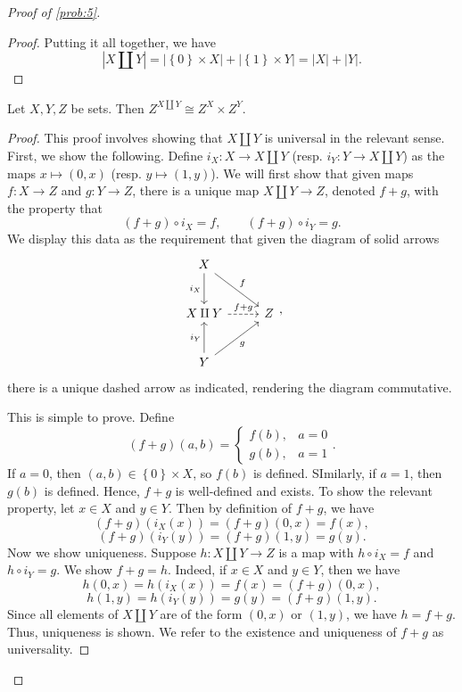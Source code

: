 \documentclass[11pt, letterpaper]{article}
\theoremstyle{definition}
\begin{document}
\begin{proof}[Proof of \cref{prob:5}]
\begin{proof}
		Putting it all together, we have
		\[
			\left| X\amalg Y \right| =\left| \left\{ 0 \right\} \times X \right| + \left| \left\{ 1 \right\} \times Y \right| =\left| X \right| +\left| Y \right| 
		.\]
	\end{proof}
	\begin{lemma}\label{lma:5-8}
		Let $X,Y,Z$ be sets. Then $Z^{X \amalg Y} \cong Z^X \times Z^Y$.
	\end{lemma}
	\begin{proof}
		This proof involves showing that $X\amalg Y$ is universal in the relevant sense. First, we show the following. Define $i_X : X \to X\amalg Y$ (resp. $i_Y : Y \to X\amalg Y$) as the maps $x\mapsto (0,x)$ (resp. $y\mapsto (1,y)$). We will first show that given maps $f : X \to Z$ and $g : Y \to Z$, there is a unique map $X\amalg Y\to Z$, denoted $f+g$, with the property that
		\[
			(f+g)\circ i_X = f,\qquad (f+g)\circ i_Y = g
		.\]
		We display this data as the requirement that given the diagram of solid arrows
		\[
			\begin{tikzcd}[row sep = 2.5em, column sep = 2.5em]
			X \ar[" i_X "', d] \ar[" f ", dr]  &  \\
			X \amalg Y \ar[" f+g ", dashed, r]  & Z \\
			Y \ar[" i_Y ", u] \ar[" g "', ur]  & 
		\end{tikzcd},
		\]
		there is a unique dashed arrow as indicated, rendering the diagram commutative.

		This is simple to prove. Define
		\[
			(f+g)(a,b) =\begin{cases}
				f(b), & a=0 \\
				g(b), & a=1
			\end{cases}
		.\]
		If $a=0$, then $(a,b)\in \left\{ 0 \right\} \times X$, so $f(b)$ is defined. SImilarly, if $a=1$, then $g(b)$ is defined. Hence, $f+g$ is well-defined and exists. To show the relevant property, let $x\in X$ and $y\in Y$. Then by definition of $f+g$, we have
		\[
			(f+g)(i_X(x)) = (f+g)(0,x) = f(x),
		\]
		\[
			(f+g)(i_Y(y)) = (f+g)(1,y) = g(y)
		.\]
		Now we show uniqueness. Suppose $h : X\amalg Y \to Z$ is a map with $h\circ i_X=f$ and $h\circ i_Y=g$. We show $f+g=h$. Indeed, if $x\in X$ and $y\in Y$, then we have
		\[
			h(0,x) = h(i_X(x)) = f(x) = (f+g)(0,x),
		\]
		\[
			h(1,y) = h(i_Y(y)) = g(y) = (f+g)(1,y)
		.\]
		Since all elements of $X\amalg Y$ are of the form $(0,x)$ or $(1,y)$, we have $h=f+g$. Thus, uniqueness is shown. We refer to the existence and uniqueness of $f+g$ as universality.


\end{proof}
\end{proof}
\end{document}
